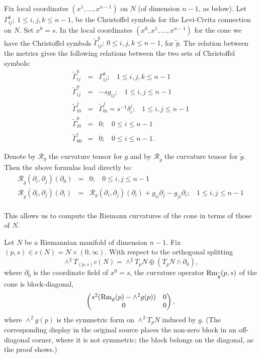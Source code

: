 Fix local coordinates $(x^1,\ldots,x^{n-1})$ on $N$ (of dimension
$n-1$, as below). Let
$\Gamma_{ij}^k;\ 1\le i,j,k\le n-1$, be the Christoffel symbols for
the Levi-Civita connection on $N$. Set $x^0=s$. In the local
coordinates $(x^0,x^1,\ldots,x^{n-1})$ for the cone we have the
Christoffel symbols $\widetilde \Gamma_{ij}^k;\ 0\le i,j,k\le n-1$,
for $\tilde g$. The relation between the metrics gives the following
relations between the two sets of Christoffel symbols:
\begin{eqnarray*}\widetilde
\Gamma_{ij}^k & = & \Gamma_{ij}^k; \ \ \ \ 1\le i,j,k\le n-1 \\
\widetilde \Gamma_{ij}^0 & = & -sg_{ij}; \ \ \ \ 1\le i,j\le n-1 \\
\widetilde\Gamma_{i0}^j & = & \widetilde\Gamma_{0i}^j =
s^{-1}\delta^j_i; \ \ \ \ 1\le i,j\le n-1 \\
\widetilde \Gamma_{i0}^0 & = & 0;\ \ \ \ 0\le i\le n-1 \\
\widetilde \Gamma_{00}^i & = & 0;\ \  \ \ 0\le i\le n-1.
\end{eqnarray*}

Denote by ${\mathcal R}_g$ the curvature tensor for $g$ and by
${\mathcal R}_{\tilde g}$ the curvature tensor for $\tilde g$. Then
the above formulas lead directly to:
\begin{eqnarray*}
{\mathcal R}_{\tilde g}(\partial_i,\partial_j)(\partial_0) & = & 0;\ \ \ \  0\le i,j\le n-1 \\
{\mathcal R}_{\tilde g}(\partial_i,\partial_j)(\partial_i) & = &
{\mathcal
R}_g(\partial_i,\partial_j)(\partial_i)+g_{ii}\partial_j-g_{ji}\partial_i;\
\ \ \  1\le i,j\le n-1 \\
\end{eqnarray*}

This allows us to compute the Riemann curvatures of the cone in
terms of those of $N$.

\begin{proposition}
\label{prop:cone-curvature}


\label{conecurv}

Let $N$ be a Riemannian manifold of dimension $n-1$. Fix $(p,s)\in
c(N)=N\times (0,\infty)$. With respect to the orthogonal splitting
$$\wedge^2T_{(p,s)}c(N)=\wedge^2T_pN\oplus
\left(T_pN\wedge\partial_0\right),$$
where $\partial_0$ is the coordinate field of $x^0=s$, the curvature
operator $\operatorname{Rm}_{\widetilde g}(p,s)$ of the cone is block-diagonal,
$$\begin{pmatrix} s^2(\operatorname{Rm}_g(p)-\wedge^2g(p)) & 0 \\ 0 & 0
\end{pmatrix},$$
where $\wedge^2g(p)$ is the symmetric form on $\wedge^2T_pN$ induced
by $g$. (The corresponding display in the original source places
the non-zero block in an off-diagonal corner, where it is not
symmetric; the block belongs on the diagonal, as the proof shows.)
\end{proposition}

